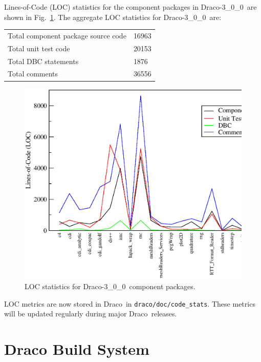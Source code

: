 \documentclass[11pt]{nmemo}
\newcommand{\draco}{Draco}
\newcommand{\dracor}{\draco-3\_0\_0}
\begin{document}
Lines-of-Code (LOC) statistics for the component packages in \dracor\ 
are shown in Fig.~\ref{fig:stats}.  The aggregate LOC statistics for
\dracor\ are:
\begin{center}
  \begin{tabular}{|l|l|} \hline
    Total component package source code & 16963 \\
    Total unit test code & 20153 \\
    Total DBC statements & 1876 \\
    Total comments & 36556 \\
    \hline
  \end{tabular}
\end{center}
\begin{figure}
  \label{fig:stats}
  \centerline{
    \includegraphics[width=6in]{loc-3_0_0.eps}}
  \caption{LOC statistics for \dracor\ component packages.}
\end{figure}

LOC metrics are now stored in \draco\ in
\texttt{draco/doc/code\_stats}.  These metrics will be updated
regularly during major \draco\ releases.


\section{Draco Build System}
\end{document}
